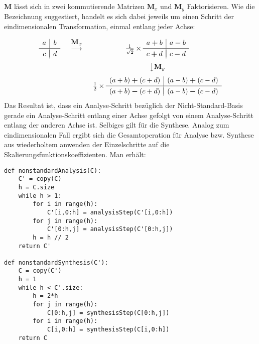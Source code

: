 %
$\mathbf{M}$ lässt sich in zwei kommutierende Matrizen $\mathbf{M}_x$ und $\mathbf{M}_y$ Faktorisieren. Wie die Bezeichnung suggestiert, handelt es sich dabei jeweils um einen Schritt der eindimensionalen Transformation, einmal entlang jeder Achse:
%
\[
\begin{array}{ccc}
\begin{array}{c|c}
a & b \\[.05cm] 
\hline \\[-0.35cm]
c & d
\end{array}
&
\begin{array}{c}
 \\[-0.3cm] \mathbf{M}_x \\[-0.1cm] \longrightarrow \\ \\
\end{array}
&
\frac{1}{\sqrt{2}} \times
\begin{array}{c|c}
a\boldsymbol{+}b & a\boldsymbol{-}b \\[.05cm] 
\hline \\[-0.35cm]
c\boldsymbol{+}d & c\boldsymbol{-}d
\end{array}
\\[.5cm]
 & & \big\downarrow \mathbf{M}_y \\[.25cm]
 & &
\frac{1}{2} \times
\begin{array}{c|c}
(a+b)\boldsymbol{+}(c+d) & (a-b)\boldsymbol{+}(c-d) \\[.05cm] 
\hline \\[-0.35cm]
(a+b)\boldsymbol{-}(c+d) & (a-b)\boldsymbol{-}(c-d)
\end{array}
\\
\end{array}
\]
%
Das Resultat ist, dass ein Analyse-Schritt bezüglich der Nicht-Standard-Basis gerade ein Analyse-Schritt entlang einer Achse gefolgt von einem Analyse-Schritt entlang der anderen Achse ist. Selbiges gilt für die Synthese. Analog zum eindimensionalen Fall ergibt sich die Gesamtoperation für Analyse bzw. Synthese aus wiederholtem anwenden der Einzelschritte auf die Skalierungsfunktionskoeffizienten. Man erhält:
%
\begin{verbatim}
def nonstandardAnalysis(C):
    C' = copy(C)
    h = C.size
    while h > 1:
        for i in range(h):
            C'[i,0:h] = analysisStep(C'[i,0:h])
        for j in range(h):
            C'[0:h,j] = analysisStep(C'[0:h,j])
        h = h // 2
    return C'

def nonstandardSynthesis(C'):
    C = copy(C')
    h = 1
    while h < C'.size:
        h = 2*h
        for j in range(h):
            C[0:h,j] = synthesisStep(C[0:h,j])
        for i in range(h):
            C[i,0:h] = synthesisStep(C[i,0:h])
    return C
\end{verbatim}
